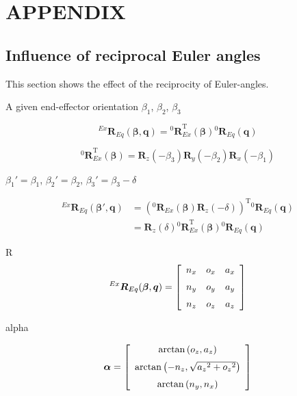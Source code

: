 \documentclass[twocolumn,10pt]{IFTOMM}
\newcommand{\bm}[1]{\boldsymbol{#1}}
\newcommand{\rotmat}[2]{{{ }^{#1}\boldsymbol{R}}_{#2}}
\newcommand{\transp}[0]{{\mathrm{T}}}
\begin{document}
\section{APPENDIX}

\subsection{Influence of reciprocal Euler angles}
\label{sec:appendix_eulerreciproc}

This section shows the effect of the reciprocity of Euler-angles.

A given end-effector orientation $\beta_1$, $\beta_2$, $\beta_3$


\begin{equation}
\rotmat{Ex}{Eq}(\bm{\beta},\bm{q})
= 
\rotmat{0}{Ex}^\transp (\bm{\beta})\rotmat{0}{Eq}(\bm{q})
\end{equation}

\begin{equation}
\rotmat{0}{Ex}^\transp(\bm{\beta})
=
\bm{R}_z(-\beta_3) \bm{R}_y(-\beta_2) \bm{R}_x(-\beta_1)
\end{equation}

$\beta_1'=\beta_1$, $\beta_2'=\beta_2$, $\beta_3'=\beta_3-\delta$

\begin{align}
\rotmat{Ex}{Eq}(\bm{\beta}',\bm{q})
&=
\left(\rotmat{0}{Ex}(\bm{\beta})\bm{R}_z(-\delta)\right)^\transp \rotmat{0}{Eq}(\bm{q}) \\
&=
\bm{R}_z(\delta) \rotmat{0}{Ex}^\transp (\bm{\beta}) \rotmat{0}{Eq}(\bm{q})
\end{align}

R
\begin{align}
\rotmat{Ex}{Eq}(\bm{\beta},\bm{q})
=\left[ \begin {array}{ccc} {n_x}&{o_x}&{a_x} \\ \noalign{\medskip}{n_y}&{o_y}&{a_y}\\ \noalign{\medskip}{ n_z}&{o_z}&{a_z}\end {array} \right] 
\end{align}

alpha

\begin{align}
\bm{\alpha} =
\left[ \begin {array}{c} \arctan \left( {o_z},{a_z} \right)  \\ \noalign{\medskip}\arctan \left( -{n_z},\sqrt {{{a_z}}^{2}+{{ o_z}}^{2}} \right) \\ \noalign{\medskip}\arctan \left( {n_y},{ n_x} \right) \end {array} \right] 
\end{align}
\end{document}
